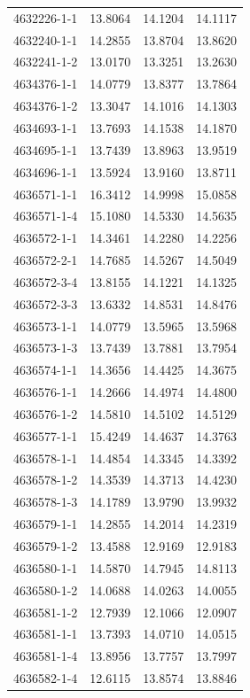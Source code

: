\begin{longtable}{lrrr}
4632226-1-1 & 13.8064 & 14.1204 & 14.1117 \\
4632240-1-1 & 14.2855 & 13.8704 & 13.8620 \\
4632241-1-2 & 13.0170 & 13.3251 & 13.2630 \\
4634376-1-1 & 14.0779 & 13.8377 & 13.7864 \\
4634376-1-2 & 13.3047 & 14.1016 & 14.1303 \\
4634693-1-1 & 13.7693 & 14.1538 & 14.1870 \\
4634695-1-1 & 13.7439 & 13.8963 & 13.9519 \\
4634696-1-1 & 13.5924 & 13.9160 & 13.8711 \\
4636571-1-1 & 16.3412 & 14.9998 & 15.0858 \\
4636571-1-4 & 15.1080 & 14.5330 & 14.5635 \\
4636572-1-1 & 14.3461 & 14.2280 & 14.2256 \\
4636572-2-1 & 14.7685 & 14.5267 & 14.5049 \\
4636572-3-4 & 13.8155 & 14.1221 & 14.1325 \\
4636572-3-3 & 13.6332 & 14.8531 & 14.8476 \\
4636573-1-1 & 14.0779 & 13.5965 & 13.5968 \\
4636573-1-3 & 13.7439 & 13.7881 & 13.7954 \\
4636574-1-1 & 14.3656 & 14.4425 & 14.3675 \\
4636576-1-1 & 14.2666 & 14.4974 & 14.4800 \\
4636576-1-2 & 14.5810 & 14.5102 & 14.5129 \\
4636577-1-1 & 15.4249 & 14.4637 & 14.3763 \\
4636578-1-1 & 14.4854 & 14.3345 & 14.3392 \\
4636578-1-2 & 14.3539 & 14.3713 & 14.4230 \\
4636578-1-3 & 14.1789 & 13.9790 & 13.9932 \\
4636579-1-1 & 14.2855 & 14.2014 & 14.2319 \\
4636579-1-2 & 13.4588 & 12.9169 & 12.9183 \\
4636580-1-1 & 14.5870 & 14.7945 & 14.8113 \\
4636580-1-2 & 14.0688 & 14.0263 & 14.0055 \\
4636581-1-2 & 12.7939 & 12.1066 & 12.0907 \\
4636581-1-1 & 13.7393 & 14.0710 & 14.0515 \\
4636581-1-4 & 13.8956 & 13.7757 & 13.7997 \\
4636582-1-4 & 12.6115 & 13.8574 & 13.8846 \\

\end{longtable}
